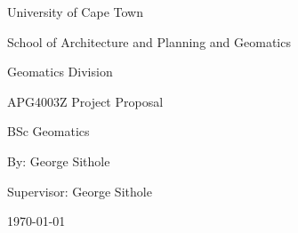 \begin{center}
{\Huge University of Cape Town}
\linebreak \linebreak

{\LARGE School of Architecture and Planning and Geomatics}
\linebreak \linebreak

{\Large Geomatics Division}
\linebreak \linebreak \linebreak
\linebreak \linebreak \linebreak
\linebreak \linebreak

{\Large APG4003Z Project Proposal}
\linebreak

{\Large BSc Geomatics}
\linebreak \linebreak \linebreak
\linebreak \linebreak \linebreak
\linebreak \linebreak

{\Large By: George Sithole}
\linebreak \linebreak

{\Large Supervisor: George Sithole}
\linebreak \linebreak

{\Large \today}

\end{center}



